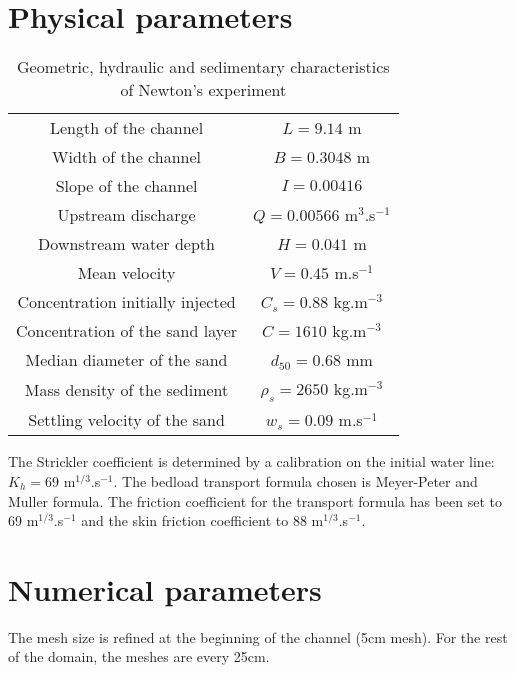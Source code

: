 \section{Physical parameters}

\begin{table}[H] %
   \begin{center}
   \caption{Geometric, hydraulic and sedimentary characteristics of Newton's experiment} %
       \begin{tabular}{|c|c|} %
       \hline %
   Length of the channel& $L=9.14$ m \\%
   Width of the channel&$ B=0.3048$ m \\
   Slope of the channel& $I=0.00416$ \\
   \hline
  Upstream discharge &$Q=0.00566$ m$^{3}$.s$^{-1}$\\
  Downstream water depth &$ H=0.041$ m \\
  Mean velocity &$V=0.45$ m.s$^{-1}$ \\  
    \hline
   Concentration initially injected& $C_s=0.88$ kg.m$^{-3}$ \\
   Concentration of the sand layer& $C=1610$ kg.m$^{-3}$ \\
   Median diameter of the sand& $d_{50}=0.68$ mm \\   
   Mass density of the sediment& $\rho_s = 2650$ kg.m$^{-3}$\\
   Settling velocity of the sand& $w_s=0.09$ m.s$^{-1}$\\
  \hline
        \end{tabular}
     \end{center}
\end{table}

The Strickler coefficient is determined by a calibration on the
initial water line: $K_h = 69$ m$^{1/3}$.s$^{-1}$. 
The bedload transport formula chosen is Meyer-Peter and Muller
formula.
The friction 
coefficient for the transport formula has been set to 69 
m$^{1/3}$.s$^{-1}$ and the skin friction coefficient to 88
m$^{1/3}$.s$^{-1}$.

\section{Numerical parameters}

The mesh size is refined at the beginning of the channel (5cm mesh). 
For the rest of the domain, the meshes are every 25cm.

